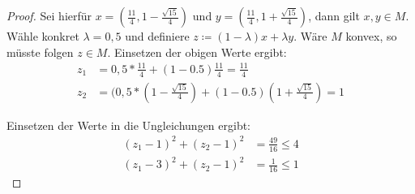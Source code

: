 \documentclass[12pt]{extreport} %
\theoremstyle{named}
\theoremstyle{nnamed}
\theoremstyle{itshape}
\theoremstyle{normal}
\begin{document}
\begin{enumerate}
\begin{proof}
		Sei hierfür $x=(\frac{11}{4}, 1-\frac{\sqrt{15}}{4})$ und $y=(\frac{11}{4}, 1+\frac{\sqrt{15}}{4})$, dann gilt $x,y\in M$. Wähle konkret $\lambda=0,5$ und definiere $z \coloneqq (1-\lambda)x+\lambda y$. Wäre $M$ konvex, so müsste folgen $z \in M$. Einsetzen der obigen Werte ergibt:
\begin{align*}
	z_1 & = 0,5*\frac{11}{4}+(1-0.5)\frac{11}{4}= \frac{11}{4} \\
	z_2 & = (0,5*(1-\frac{\sqrt{15}}{4})+(1-0.5)(1+\frac{\sqrt{15}}{4})= 1
\end{align*}

Einsetzen der Werte in die Ungleichungen ergibt: \\
\begin{align*}
	(z_1-1)^2+(z_2-1)^2 & = \frac{49}{16} \leq 4 \\
	(z_1-3)^2+(z_2-1)^2 & = \frac{1}{16} \leq 1 
\end{align*}


\end{proof}
\end{enumerate}
\end{document}

